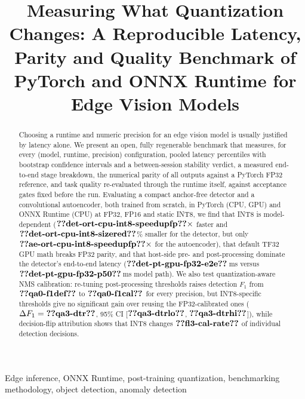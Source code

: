 \documentclass[conference]{IEEEtran}
\begin{document}
\title{Measuring What Quantization Changes: A Reproducible Latency, Parity and Quality Benchmark of PyTorch and ONNX Runtime for Edge Vision Models}

\author{
}

\maketitle

\begin{abstract}
Choosing a runtime and numeric precision for an edge vision model is usually justified by latency alone. We present
an open, fully regenerable benchmark that measures, for every (model, runtime, precision) configuration, pooled latency
percentiles with bootstrap confidence intervals and a between-session stability verdict, a measured end-to-end stage
breakdown, the numerical parity of all outputs against a PyTorch FP32 reference, and task quality re-evaluated through
the runtime itself, against acceptance gates fixed before the run. Evaluating a compact anchor-free detector and a
convolutional autoencoder, both trained from scratch, in PyTorch (CPU, GPU) and ONNX Runtime (CPU) at FP32, FP16 and
static INT8, we find that INT8 is model-dependent ($\res{det-ort-cpu-int8-speedupfp}\times$ faster and
$\res{det-ort-cpu-int8-sizered}$\% smaller for the detector, but only $\res{ae-ort-cpu-int8-speedupfp}\times$ for the
autoencoder), that default TF32 GPU math breaks FP32 parity, and that host-side pre- and post-processing dominate the
detector's end-to-end latency ($\res{det-pt-gpu-fp32-e2e}$\,ms versus $\res{det-pt-gpu-fp32-p50}$\,ms model path).
We also test quantization-aware NMS calibration: re-tuning post-processing thresholds raises detection $F_1$ from
$\res{qa0-f1def}$ to $\res{qa0-f1cal}$ for every precision, but INT8-specific thresholds give no significant gain
over reusing the FP32-calibrated ones ($\Delta F_1 = \res{qa3-dtr}$, 95\% CI [$\res{qa3-dtrlo}$, $\res{qa3-dtrhi}$]),
while decision-flip attribution shows that INT8 changes $\res{fl3-cal-rate}$ of individual detection decisions.
\end{abstract}

\begin{IEEEkeywords}
Edge inference, ONNX Runtime, post-training quantization, benchmarking methodology, object detection, anomaly detection
\end{IEEEkeywords}
\end{document}
